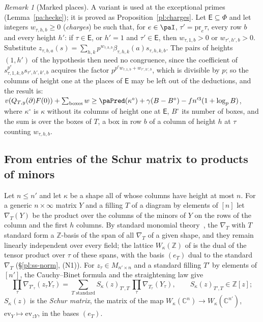 \documentclass[10pt]{amsart}
\theoremstyle{definition}
\theoremstyle{remark}
\newtheorem{remark}[theorem]{Remark}
\newcommand{\C}{\mathbb C}
\newcommand{\Z}{\mathbb Z}
\providecommand{\auPl}{\Phi}
\begin{document}
\begin{remark}[Marked places]\label{pa:charges}
A variant is used at the exceptional primes (Lemma~\ref{pa:hecke}); it is proved as
Proposition~\ref{pl:charges}. Let
$\mathsf E\subseteq\auPl$ and let integers $w_{\tau,h,b}\ge0$ (\emph{charges}) be such that, for
$e\in\paI$, $\tau'=\mathrm{pr}_e\tau$, every row $b$ and every height $h'$: if $\tau\in\mathsf E$,
or $h'=1$ and $\tau'\in\mathsf E$, then $w_{\tau,1,b}>0$ or $w_{\tau',h',b}>0$. Substitute
$z_{\tau,b,a}(s)=\sum_{h,k}p^{w_{\tau,h,b}}\beta_{\tau,h,k}(a)s_{\tau,h,k,b}$. The pairs of heights
$(1,h')$ of the hypothesis then need no congruence, since the coefficient of
$s_{\tau,1,k,b}^{p^e}s_{\tau',h',k',b}$ acquires the factor $p^{p^ew_{\tau,1,b}+w_{\tau',h',b}}$,
which is divisible by $p$; so the columns of height one at the places of $\mathsf E$ may be left out of the
deductions, and the result is: $v(Q_{T,y}(\partial)F(0))+\sum_{\text{boxes}}w\ge
\paPred(\kappa^\circ)+\gamma(B-B^\circ)-fn'^3(1+\log_pB)$, where $\kappa^\circ$ is $\kappa$
without its columns of height one at $\mathsf E$, $B^\circ$ its number of boxes, and the sum is
over the boxes of $T$, a box in row $b$ of a column of height $h$ at $\tau$ counting
$w_{\tau,h,b}$.
\end{remark}

\subsection*{From entries of the Schur matrix to products of minors}
Let $n\le n'$ and let $\kappa$ be a shape all of whose columns have height at most $n$. For a
generic $n\times\infty$ matrix $Y$ and a filling $T$ of a diagram by elements of $[n]$ let
$\nabla_T(Y)$ be the product over the columns of the minors of $Y$ on the rows of the column and
the first $h$ columns. By standard monomial theory~\cite[\S\S1--2, Thm.~2.1]{DEP}, \cite[\S8.1, Thm.~1 and its corollary]{FultonYT} the $\nabla_T$ with $T$
standard form a $\Z$-basis of the span of all $\nabla_T$ of a given shape, and they remain linearly
independent over every field; the lattice $W_\kappa(\Z)$ of {\cite[\S14.3]{P46}} is the dual of the tensor product over $\tau$ of
these spans, with the basis $(e_T)$ dual to the standard $\nabla_T$ (\S\ref{pl:ss-norm}, (N1)). For $z_\tau\in M_{n'\times n}$ and a standard filling $T'$ by
elements of $[n']$, the Cauchy--Binet formula and the straightening law give
\[
\prod_\tau\nabla_{T'_\tau}(z_\tau Y_\tau)=\sum_{T\text{ standard}}S_\kappa(z)_{T',T}\,\prod_\tau
\nabla_{T_\tau}(Y_\tau),\qquad S_\kappa(z)_{T',T}\in\Z[z];
\]
$S_\kappa(z)$ is the \emph{Schur matrix}, the matrix of the map $W_\kappa(\C^n)\to W_\kappa(\C^{n'})$,
$\mathrm{ev}_Y\mapsto\mathrm{ev}_{zY}$, in the bases $(e_T)$.
\end{document}
